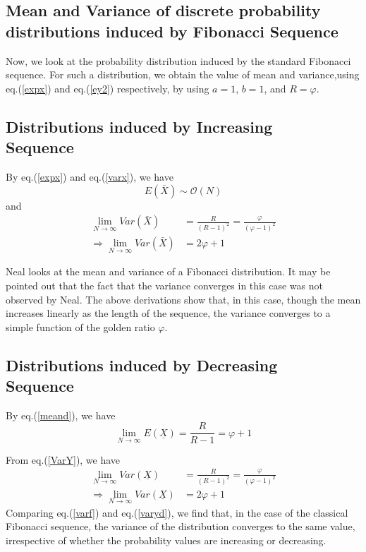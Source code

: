 \begin{multicols}{2}
\section{Mean and Variance of discrete probability distributions induced by Fibonacci Sequence}\label{section-8}

Now, we look at the probability distribution induced by the standard Fibonacci sequence. For such a distribution, we obtain the value of mean and variance,using eq.(\ref{expx}) and eq.(\ref{ey2}) respectively, by using $a = 1 $, $b = 1$, and $R = \varphi$.

\subsection{Distributions induced by Increasing\\ Sequence}\label{subsection-8.1}

By eq.(\ref{expx}) and eq.(\ref{varx}), we have 
$$
\nonumber E(\bar{X})  \sim \mathcal{O}(N)
$$
and 
\begin{align}
\lim_{N \rightarrow \infty}Var(\bar{X}) &= \frac{R}{(R-1)^2} = \frac{\varphi}{(\varphi-1)^2}\nonumber\\
\Rightarrow \lim_{N \rightarrow \infty}Var(\bar{X}) &= 2\varphi+1\label{eq-8.1}
\end{align}

\vspace{-.3cm}

Neal \cite{art1-key01} looks at the mean and variance of a Fibonacci distribution. It may be pointed out that the fact that the variance converges in this case was not observed by Neal. The above derivations show that, in this case, though the mean increases linearly as the length of the sequence, the variance converges to a simple function of the golden ratio $\varphi$.

\subsection{Distributions induced by Decreasing\\ Sequence}\label{subsection-8.2}
By eq.(\ref{meand}), we have
\begin{equation}
\nonumber \displaystyle{\lim_{N \rightarrow \infty}}E(\underline{X}) =  \displaystyle{\frac{R}{R-1}} = \varphi + 1
 \end{equation}

From eq.(\ref{VarY}), we have
\begin{align}
\displaystyle{\lim_{N \rightarrow \infty}}Var(\underline{X}) &= \frac{R}{(R-1)^2} =\frac{\varphi}{(\varphi-1)^2} \nonumber \\
\Rightarrow \displaystyle{\lim_{N \rightarrow \infty}}Var(\underline{X}) &= 2\varphi + 1\label{eq-8.2}
\end{align}
Comparing eq.(\ref{varf}) and eq.(\ref{varyd}), we find that, in the case of the classical Fibonacci sequence, the variance of the distribution converges to the same value, irrespective of whether the probability values are increasing or decreasing.


\end{multicols}
